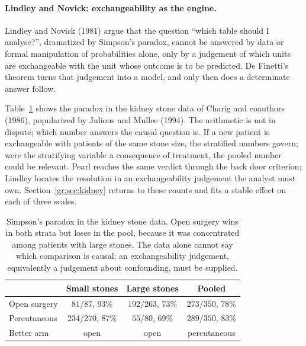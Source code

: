 \paragraph{Lindley and Novick: exchangeability as the engine.} Lindley and Novick (1981) argue that the question ``which table should I analyse?'', dramatized by Simpson's paradox, cannot be answered by data or formal manipulation of probabilities alone, only by a judgement of which units are exchangeable with the unit whose outcome is to be predicted. De Finetti's theorem turns that judgement into a model, and only then does a determinate answer follow.

Table~\ref{fw:tab:simpson} shows the paradox in the kidney stone data of Charig and coauthors (1986), popularized by Julious and Mullee (1994). The arithmetic is not in dispute; which number answers the causal question is. If a new patient is exchangeable with patients of the same stone size, the stratified numbers govern; were the stratifying variable a consequence of treatment, the pooled number could be relevant. Pearl reaches the same verdict through the back door criterion; Lindley locates the resolution in an exchangeability judgement the analyst must own. Section~\ref{gr:sec:kidney} returns to these counts and fits a stable effect on each of three scales.

\begin{table}[htbp]
\centering\small
\setlength{\tabcolsep}{4pt}
\begin{tabular}{@{}lccc@{}}
\toprule
 & Small stones & Large stones & Pooled \\
\midrule
Open surgery & $81/87$, 93\% & $192/263$, 73\% & $273/350$, 78\% \\
Percutaneous & $234/270$, 87\% & $55/80$, 69\% & $289/350$, 83\% \\
\midrule
Better arm & open & open & percutaneous \\
\bottomrule
\end{tabular}
\caption{Simpson's paradox in the kidney stone data. Open surgery wins in both strata but loses in the pool, because it was concentrated among patients with large stones. The data alone cannot say which comparison is causal; an exchangeability judgement, equivalently a judgement about confounding, must be supplied.}
\label{fw:tab:simpson}
\end{table}

